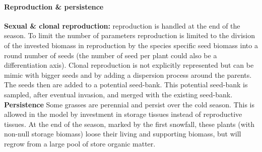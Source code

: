 \documentclass[a4paper,twoside, justified,marginals=raggedright, nobib]{tufte-handout}
\begin{document}
\paragraph{Reproduction \& persistence}
\textbf{Sexual \& clonal reproduction:} reproduction is handled at the end of the season. To limit the number of parameters reproduction is limited to the division of the invested biomass in reproduction by the species specific seed biomass into a round number of seeds (the number of seed per plant could also be a differentiation axis). Clonal reproduction is not explicitly represented but can be mimic with bigger seeds and by adding a dispersion process around the parents. The seeds then are added to a potential seed-bank. This potential seed-bank is sampled, after eventual invasion, and merged with the existing seed-bank.\\

\textbf{Persistence} Some grasses are perennial and persist over the cold season. This is allowed in the model by investment in storage tissues instead of reproductive tissues.  At the end of the season, marked by the first snowfall, these plants (with non-null storage biomass) loose their living and supporting biomass, but will regrow from a large pool of store organic matter.
\end{document}
